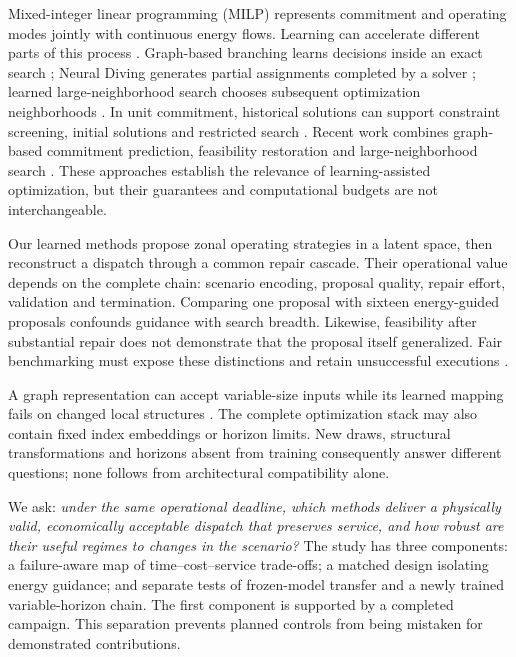Mixed-integer linear programming (MILP) represents commitment and operating
modes jointly with continuous energy flows. Learning can accelerate different
parts of this process \citep{bengio2021}. Graph-based branching learns decisions
inside an exact search \citep{gasse2019}; Neural Diving generates partial
assignments completed by a solver \citep{nair2021}; learned large-neighborhood
search chooses subsequent optimization neighborhoods \citep{sonnerat2022}.
In unit commitment, historical solutions can support constraint screening,
initial solutions and restricted search \citep{xavier2021}. Recent work combines
graph-based commitment prediction, feasibility restoration and large-neighborhood
search \citep{yang2025lns}. These approaches establish the relevance of
learning-assisted optimization, but their guarantees and computational budgets
are not interchangeable.

Our learned methods propose zonal operating strategies in a latent space,
then reconstruct a dispatch through a common repair cascade. Their operational
value depends on the complete chain: scenario encoding, proposal quality,
repair effort, validation and termination. Comparing one proposal with sixteen
energy-guided proposals confounds guidance with search breadth. Likewise,
feasibility after substantial repair does not demonstrate that the proposal
itself generalized. Fair benchmarking must expose these distinctions and
retain unsuccessful executions \citep{beiranvand2017}.

A graph representation can accept variable-size inputs while its learned
mapping fails on changed local structures \citep{yehudai2021}. The complete
optimization stack may also contain fixed index embeddings or horizon limits.
New draws, structural transformations and horizons absent from training
consequently answer different questions; none follows from architectural
compatibility alone.

We ask: \emph{under the same operational deadline, which methods deliver a
physically valid, economically acceptable dispatch that preserves service,
and how robust are their useful regimes to changes in the scenario?}
The study has three components: a failure-aware map of time--cost--service
trade-offs; a matched design isolating energy guidance; and separate tests of
frozen-model transfer and a newly trained variable-horizon chain. The first
component is supported by a completed campaign. \pIIIntroStatus
This separation prevents
planned controls from being mistaken for demonstrated contributions.

